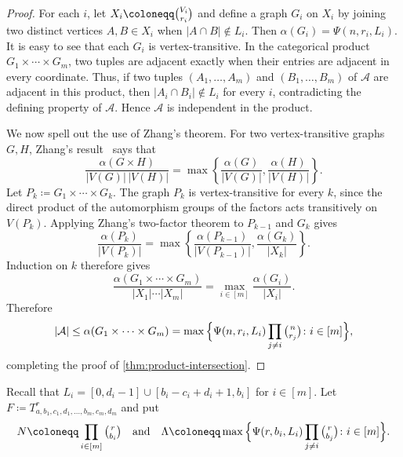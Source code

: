 \documentclass[10pt,a4paper]{article}
\theoremstyle{plain}
\theoremstyle{definition}
\theoremstyle{plain}
\newcommand{\calA}{\mathcal A}
\begin{document}
\begin{proof}
For each $i$, let $X_i\coloneqq\tbinom{V_i}{r_i}$ and define a graph $G_i$ on $X_i$ by joining two distinct vertices $A,B\in X_i$ when $|A\cap B|\notin L_i$.  Then $\alpha(G_i)=\Psi(n,r_i,L_i)$.  It is easy to see that each $G_i$ is vertex-transitive.  In the categorical product $G_1\times\cdots\times G_m$, two tuples are adjacent exactly when their entries are adjacent in every coordinate.  Thus, if two tuples $(A_1,\ldots,A_m)$ and $(B_1,\ldots,B_m)$ of $\calA$ are adjacent in this product, then $|A_i\cap B_i|\notin L_i$ for every $i$, contradicting the defining property of $\calA$.  Hence $\calA$ is independent in the product.

We now spell out the use of Zhang's theorem.  For two vertex-transitive graphs $G,H$, Zhang's result~\cite{Zhang10} says that
\[
        \frac{\alpha(G\times H)}{|V(G)|\,|V(H)|}
        =
        \max\left\{
        \frac{\alpha(G)}{|V(G)|},
        \frac{\alpha(H)}{|V(H)|}
        \right\}.
\]
Let $P_k\coloneqq G_1\times\cdots\times G_k$.  The graph $P_k$ is vertex-transitive for every $k$, since the direct product of the automorphism groups of the factors acts transitively on $V(P_k)$.  Applying Zhang's two-factor theorem to $P_{k-1}$ and $G_k$ gives
\[
        \frac{\alpha(P_k)}{|V(P_k)|}
        =
        \max\left\{
        \frac{\alpha(P_{k-1})}{|V(P_{k-1})|},
        \frac{\alpha(G_k)}{|X_k|}
        \right\}.
\]
Induction on $k$ therefore gives
\[
        \frac{\alpha(G_1\times\cdots\times G_m)}{|X_1|\cdots |X_m|}
        =\max_{i\in[m]}\frac{\alpha(G_i)}{|X_i|}.
\]
Therefore
\[
        |\calA|\le\alpha(G_1\times\cdots\times G_m)
        =\max\Big\{\Psi(n,r_i,L_i)\prod_{j\ne i}\tbinom{n}{r_j} \colon i \in [m]\Big\}, 
\]
completing the proof of \cref{thm:product-intersection}. 
\end{proof}

Recall that $L_i=[0,d_i-1]\cup[b_i-c_i+d_i+1,b_i]$ for $i\in[m]$.  Let $F\coloneqq T^r_{a,b_1,c_1,d_1,\ldots,b_m,c_m,d_m}$ and put
\[
        N\coloneqq\prod_{i\in [m]}\tbinom{r}{b_i}
        \quad\text{and}\quad
        \Lambda\coloneqq
        \max\Big\{\Psi(r,b_i,L_i)\prod_{j\ne i}\tbinom{r}{b_j} \colon i \in [m]\Big\}.
\]
\end{document}
